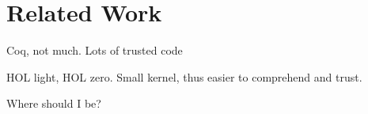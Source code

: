 \chapter{Related Work}\label{chapter:related}

Coq, not much. Lots of trusted code

HOL light, HOL zero. Small kernel, thus easier to comprehend and trust.

Where should I be?